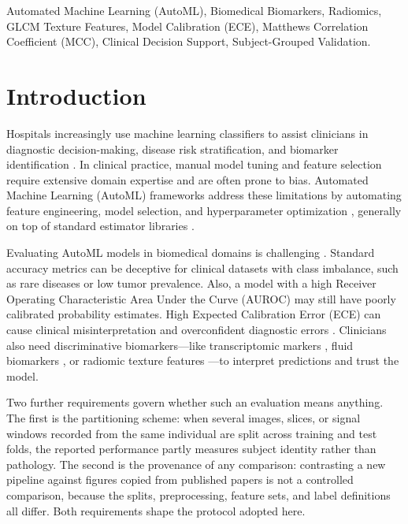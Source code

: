 \documentclass[conference]{IEEEtran}
\begin{document}
\begin{abstract}
\end{abstract}

\begin{IEEEkeywords}
Automated Machine Learning (AutoML), Biomedical Biomarkers, Radiomics, GLCM Texture Features, Model Calibration (ECE), Matthews Correlation Coefficient (MCC), Clinical Decision Support, Subject-Grouped Validation.
\end{IEEEkeywords}

\section{Introduction}
Hospitals increasingly use machine learning classifiers to assist clinicians in diagnostic decision-making, disease risk stratification, and biomarker identification \cite{brown2024evaluation, zhao2024llm2automl, patel2023automl}. In clinical practice, manual model tuning and feature selection require extensive domain expertise and are often prone to bias. Automated Machine Learning (AutoML) frameworks address these limitations by automating feature engineering, model selection, and hyperparameter optimization \cite{diabetes2023comparison}, generally on top of standard estimator libraries \cite{scikit2011}.

Evaluating AutoML models in biomedical domains is challenging \cite{santos2023multi, singh2024metric}. Standard accuracy metrics can be deceptive for clinical datasets with class imbalance, such as rare diseases or low tumor prevalence. Also, a model with a high Receiver Operating Characteristic Area Under the Curve (AUROC) may still have poorly calibrated probability estimates. High Expected Calibration Error (ECE) can cause clinical misinterpretation and overconfident diagnostic errors \cite{guo2017calibration, vancalster2019calibration}. Clinicians also need discriminative biomarkers---like transcriptomic markers \cite{kim2024integrating}, fluid biomarkers \cite{xu2024llm}, or radiomic texture features \cite{baker2022radiomics, martinez2023predicting}---to interpret predictions and trust the model.

Two further requirements govern whether such an evaluation means anything. The first is the partitioning scheme: when several images, slices, or signal windows recorded from the same individual are split across training and test folds, the reported performance partly measures subject identity rather than pathology. The second is the provenance of any comparison: contrasting a new pipeline against figures copied from published papers is not a controlled comparison, because the splits, preprocessing, feature sets, and label definitions all differ. Both requirements shape the protocol adopted here.
\end{document}
